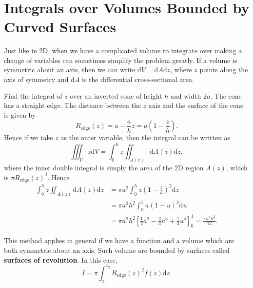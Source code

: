 \documentclass[../multivariate_calculus.tex]{subfiles}
\begin{document}
    \section{Integrals over Volumes Bounded by Curved Surfaces}
        \paragraph{}
        Just like in 2D, when we have a complicated volume to integrate over making a change of variables can sometimes simplify the problem greatly.
        If a volume is symmetric about an axis, then we can write $\mathrm{d}V=\mathrm{d}A\mathrm{d}z$, where $z$ points along the axis of symmetry and $\mathrm{d}A$ is the differential cross-sectional area.
        \begin{example}
            Find the integral of $z$ over an inverted cone of height $h$ and width $2a$.
            The cone has a straight edge. The distance between the $z$ axis and the surface of the cone is given by
            \begin{equation}
                R_\text{edge}(z)=a-\frac{a}{h}z=a\left(1-\frac{z}{h}\right).
            \end{equation}
            Hence if we take $z$ as the outer variable, then the integral can be written as
            \begin{equation}
                \iiint_V z\mathrm{d}V=\int_0^h z\iint_{A(z)}\mathrm{d}A(z)\mathrm{d}z,
            \end{equation}
            where the inner double integral is simply the area of the 2D region $A(z)$, which is $\pi R_\text{edge}(z)^2$.
            Hence
            \begin{align}
                \int_0^h z\iint_{A(z)}\mathrm{d}A(z)\mathrm{d}z&=\pi a^2\int_0^h z\left(1-\frac{z}{h}\right)^2\mathrm{d}z\\
                &=\pi a^2h^2\int_0^1 u(1-u)^2\mathrm{d}u\\
                &=\pi a^2h^2\left[\frac{1}{2}a^2-\frac{2}{3}u^3+\frac{1}{4}u^4\right]_0^1=\frac{\pi a^2h^2}{12}.
            \end{align}
        \end{example}
        This method applies in general if we have a function and a volume which are both symmetric about an axis.
        Such volume are bounded by surfaces called \textbf{surfaces of revolution}.
        In this case,
        \begin{equation}
            I=\pi\int_{z_1}^{z_2}R_\text{edge}(z)^2 f(z)\mathrm{d}z.
        \end{equation}
\end{document}
